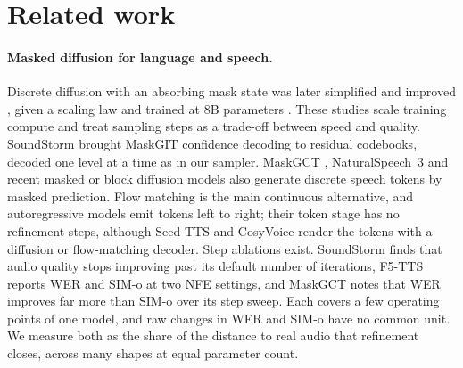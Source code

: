 \section{Related work}
\label{sec:related}

\paragraph{Masked diffusion for language and speech.}
Discrete diffusion with an absorbing mask state \citep{d3pm} was later simplified and improved
\citep{sedd,mdlm,md4}, given a scaling law \citep{nie2025scaling} and trained at 8B
parameters \citep{llada}. These studies scale training compute and treat sampling steps as
a trade-off between speed and quality.
SoundStorm \citep{soundstorm} brought MaskGIT confidence decoding \citep{maskgit} to residual
codebooks, decoded one level at a time as in our sampler. MaskGCT \citep{maskgct},
NaturalSpeech~3 \citep{naturalspeech3} and recent masked or block diffusion models
\citep{fan2026lladatts,madha2026dllmtts} also generate discrete speech tokens by masked
prediction. Flow matching \citep{voicebox,e2tts,f5tts} is the main continuous alternative, and
autoregressive models \citep{audiolm,valle,seedtts,cosyvoice,llasa} emit tokens left to
right; their token stage has no refinement steps, although Seed-TTS and CosyVoice render the
tokens with a diffusion or flow-matching decoder. Step ablations exist. SoundStorm finds that audio quality stops
improving past its default number of iterations, F5-TTS reports WER and SIM-o at two NFE
settings, and MaskGCT notes that WER improves far more than SIM-o over its step sweep. Each
covers a few operating points of one model, and raw changes in WER and SIM-o have no common
unit. We measure both as the share of the distance to real audio that refinement closes,
across many shapes at equal parameter count.

